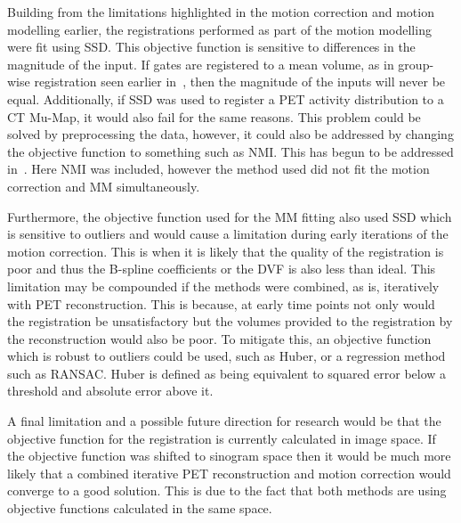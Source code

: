         Building from the limitations highlighted in the motion correction and motion modelling earlier, the registrations performed as part of the motion modelling were fit using \gls{SSD}. This objective function is sensitive to differences in the magnitude of the input. If gates are registered to a mean volume, as in group-wise registration seen earlier in~, then the magnitude of the inputs will never be equal. Additionally, if \gls{SSD} was used to register a \gls{PET} activity distribution to a \gls{CT} \gls{Mu-Map}, it would also fail for the same reasons. This problem could be solved by preprocessing the data, however, it could also be addressed by changing the objective function to something such as \gls{NMI}. This has begun to be addressed in~. Here \gls{NMI} was included, however the method used did not fit the motion correction and \gls{MM} simultaneously.
        
        Furthermore, the objective function used for the \gls{MM} fitting also used \gls{SSD} which is sensitive to outliers and would cause a limitation during early iterations of the motion correction. This is when it is likely that the quality of the registration is poor and thus the B-spline coefficients or the \gls{DVF} is also less than ideal. This limitation may be compounded if the methods were combined, as is, iteratively with \gls{PET} reconstruction. This is because, at early time points not only would the registration be unsatisfactory but the volumes provided to the registration by the reconstruction would also be poor. To mitigate this, an objective function which is robust to outliers could be used, such as Huber, or a regression method such as \gls{RANSAC}. Huber is defined as being equivalent to squared error below a threshold and absolute error above it.
        
        A final limitation and a possible future direction for research would be that the objective function for the registration is currently calculated in image space. If the objective function was shifted to sinogram space then it would be much more likely that a combined iterative \gls{PET} reconstruction and motion correction would converge to a good solution. This is due to the fact that both methods are using objective functions calculated in the same space.
